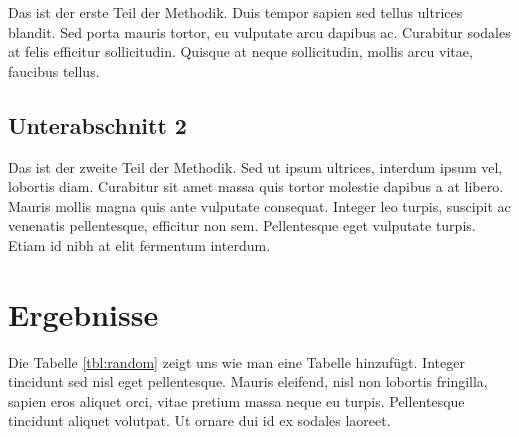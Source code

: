 \documentclass[listof=totoc,index=totoc,bibliography=totoc,12pt,german,a4paper,]{report}
\begin{document}
Das ist der erste Teil der Methodik. Duis tempor sapien sed tellus
ultrices blandit. Sed porta mauris tortor, eu vulputate arcu dapibus ac.
Curabitur sodales at felis efficitur sollicitudin. Quisque at neque
sollicitudin, mollis arcu vitae, faucibus tellus.

\subsection{Unterabschnitt 2}\label{unterabschnitt-2-2}

Das ist der zweite Teil der Methodik. Sed ut ipsum ultrices, interdum
ipsum vel, lobortis diam. Curabitur sit amet massa quis tortor molestie
dapibus a at libero. Mauris mollis magna quis ante vulputate consequat.
Integer leo turpis, suscipit ac venenatis pellentesque, efficitur non
sem. Pellentesque eget vulputate turpis. Etiam id nibh at elit fermentum
interdum.

\section{Ergebnisse}\label{ergebnisse-2}

Die Tabelle \ref{tbl:random} zeigt uns wie man eine Tabelle hinzufügt.
Integer tincidunt sed nisl eget pellentesque. Mauris eleifend, nisl non
lobortis fringilla, sapien eros aliquet orci, vitae pretium massa neque
eu turpis. Pellentesque tincidunt aliquet volutpat. Ut ornare dui id ex
sodales laoreet.

\newpage

\def\pandoctableshortcapt{Table short caption}
\end{document}
